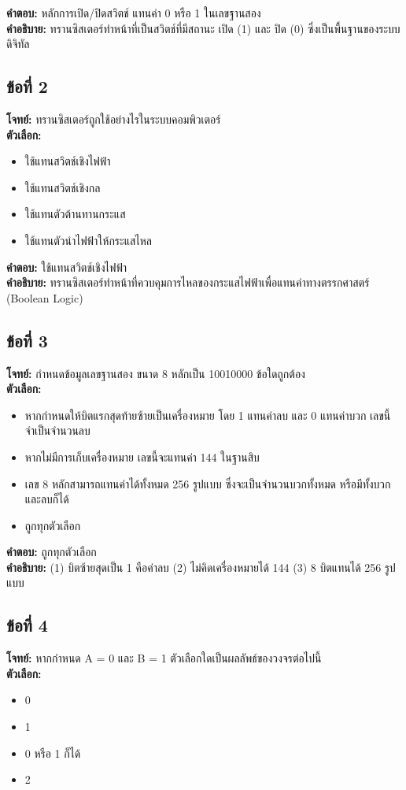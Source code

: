 \documentclass[12pt]{article}
\begin{document}
\textbf{คำตอบ:} หลักการเปิด/ปิดสวิตช์ แทนค่า 0 หรือ 1 ในเลขฐานสอง\\
\textbf{คำอธิบาย:} ทรานซิสเตอร์ทำหน้าที่เป็นสวิตช์ที่มีสถานะ เปิด (1) และ ปิด (0) ซึ่งเป็นพื้นฐานของระบบดิจิทัล

\subsection*{ข้อที่ 2}
\textbf{โจทย์:} ทรานซิสเตอร์ถูกใช้อย่างไรในระบบคอมพิวเตอร์\\
\textbf{ตัวเลือก:}
\begin{itemize}
    \item ใช้แทนสวิตช์เชิงไฟฟ้า
    \item ใช้แทนสวิตช์เชิงกล
    \item ใช้แทนตัวต้านทานกระแส
    \item ใช้แทนตัวนำไฟฟ้าให้กระแสไหล
\end{itemize}

\textbf{คำตอบ:} ใช้แทนสวิตช์เชิงไฟฟ้า\\
\textbf{คำอธิบาย:} ทรานซิสเตอร์ทำหน้าที่ควบคุมการไหลของกระแสไฟฟ้าเพื่อแทนค่าทางตรรกศาสตร์ (Boolean Logic)

\subsection*{ข้อที่ 3}
\textbf{โจทย์:} กำหนดข้อมูลเลขฐานสอง ขนาด 8 หลักเป็น 10010000 ข้อใดถูกต้อง\\
\textbf{ตัวเลือก:}
\begin{itemize}
    \item หากกำหนดให้บิตแรกสุดท้ายซ้ายเป็นเครื่องหมาย โดย 1 แทนค่าลบ และ 0 แทนค่าบวก เลขนี้จำเป็นจำนวนลบ
    \item หากไม่มีการเก็บเครื่องหมาย เลขนี้จะแทนค่า 144 ในฐานสิบ
    \item เลข 8 หลักสามารถแทนค่าได้ทั้งหมด 256 รูปแบบ ซึ่งจะเป็นจำนวนบวกทั้งหมด หรือมีทั้งบวกและลบก็ได้
    \item ถูกทุกตัวเลือก
\end{itemize}

\textbf{คำตอบ:} ถูกทุกตัวเลือก\\
\textbf{คำอธิบาย:} (1) บิตซ้ายสุดเป็น 1 คือค่าลบ (2) ไม่คิดเครื่องหมายได้ 144 (3) 8 บิตแทนได้ 256 รูปแบบ

\subsection*{ข้อที่ 4}
\textbf{โจทย์:} หากกำหนด A = 0 และ B = 1 ตัวเลือกใดเป็นผลลัพธ์ของวงจรต่อไปนี้\\
\textbf{ตัวเลือก:}
\begin{itemize}
    \item 0
    \item 1
    \item 0 หรือ 1 ก็ได้
    \item 2
\end{itemize}
\end{document}
